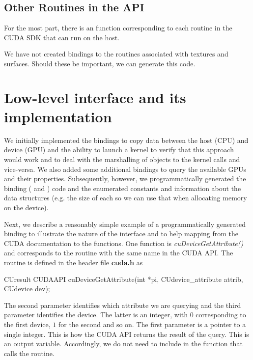 \documentclass[article]{jss}
\def\C{\proglang{C}}
\def\R{\proglang{R}}
\def\Rfunc#1{\textsl{#1()}}
\def\file#1{\textbf{#1}}
\begin{document}
\subsection{Other Routines in the API}

For the most part, there is an \R{} function corresponding 
to  each routine in the CUDA SDK  that can run on the host.

We have not created bindings to the routines associated with textures
and surfaces.  Should these be important, we can generate this code.
 





\section{Low-level interface and its implementation}
We initially implemented the bindings to copy data between the host
(CPU) and device (GPU) and the ability to launch a kernel to verify
that this approach would work and to deal with the marshalling of \R{}
objects to the kernel calls and vice-versa.  We also added some
additional bindings to query the available GPUs and their properties.
Subsequently, however, we programmatically generated the binding (\R{}
and \C) code and the enumerated constants and information about the
data structures (e.g. the size of each so we can use that when
allocating memory on the device).  

Next, we describe a reasonably simple example of a programmatically
generated binding to illustrate the nature of the interface and to
help mapping  from the CUDA documentation to the \R{} functions.
One function is \Rfunc{cuDeviceGetAttribute} and corresponds to the routine
with the same name in the CUDA API.
The routine is defined  in the header file \file{cuda.h} as
\begin{Code}
CUresult CUDAAPI 
cuDeviceGetAttribute(int *pi, CUdevice_attribute attrib, CUdevice dev);
\end{Code}
The second parameter identifies which attribute we are querying and
the third parameter identifies the device. The latter is an integer,
with $0$ corresponding to the first device, $1$ for the second and so
on.  The first parameter is a pointer to a single integer. This is how
the CUDA API returns the result of the query.  This is an output
variable. Accordingly, we do not need to include in the \R{} function
that calls the \C{} routine.
\end{document}
